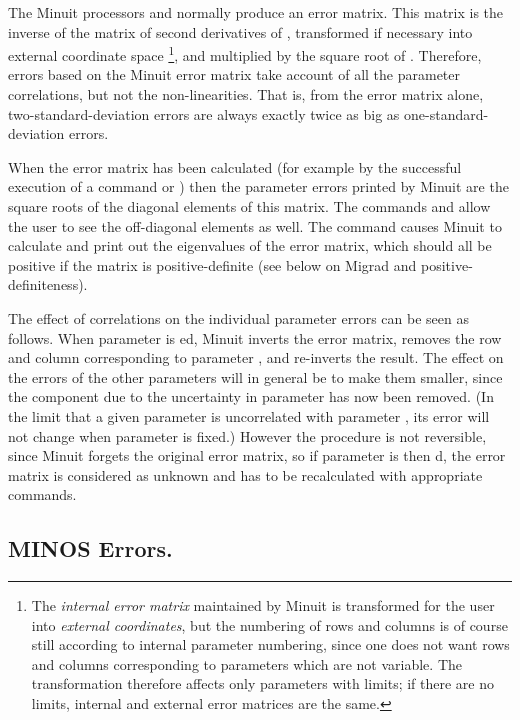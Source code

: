 The Minuit processors  and  
normally produce an error matrix.
This matrix is the inverse of the matrix of second derivatives of ,
transformed if necessary into external coordinate space%
\footnote{The {\it internal error matrix} maintained by Minuit is transformed
for the user into {\it external coordinates}, but the numbering
of rows and columns is of course still according to internal parameter
numbering, since one does not want rows and columns corresponding to
parameters which are not variable. The transformation therefore
affects only parameters with limits; if there are no limits, internal and
external error matrices are the same.},
and multiplied by the square root of .
Therefore, errors based on the Minuit error matrix take account of all the
parameter correlations, but not the non-linearities. That is, from the error
matrix alone, two-standard-deviation errors are always exactly twice as big
as one-standard-deviation errors.
 
When the error matrix has been calculated (for example by the successful
execution of a command  or ) then the parameter errors
printed by Minuit are the square roots of the diagonal elements of this
matrix. The commands  and 
allow the user to see the off-diagonal elements as well.
The command  causes Minuit to calculate and print
out the eigenvalues of the error matrix, which should all be
positive if the matrix is positive-definite (see below on Migrad and
positive-definiteness).
 
The effect of correlations on the individual parameter errors can be
seen as follows. When parameter  is ed, 
Minuit inverts the error
matrix, removes the row and column corresponding to parameter , and
re-inverts the result. The effect on the errors of the other parameters
will in general be to make them smaller, since the component due to
the uncertainty in parameter  has now been removed. (In the limit
that a given parameter is uncorrelated with parameter , its error will
not change when parameter  is fixed.)
However the procedure is not reversible, since Minuit forgets the
original error matrix, so if parameter  is then d, 
the error matrix is considered as unknown and has to be recalculated with
appropriate commands.

\subsection{MINOS Errors.}

